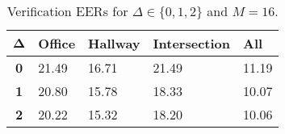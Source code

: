 \begin{table}[h]
    \centering
    \begin{tabular}{|c|M{2cm}|M{2cm}|M{2cm}|M{2cm}|}
    \hline
    $\boldsymbol{\Delta}$ & \bf{Office} & \bf{Hallway} & \bf{Intersection} & \bf{All} \\ 
    \hline 
    \hline
    \bf{0} & 21.49 & 16.71 & 21.49 & 11.19 \\
    \hline
    \bf{1} & 20.80 & 15.78 & 18.33 & 10.07 \\
    \hline
    \bf{2} & 20.22 & 15.32 & 18.20 & 10.06 \\
    \hline
    \end{tabular}
    \caption{Verification EERs for $\Delta \in \{0, 1, 2\}$ and $M = 16$.}
    \label{tab:verify_speakers_M_16}
\end{table}
